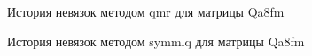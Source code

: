 \begin{figure}
    \renewcommand{\figurename}{Рисунок}
    \caption{История невязок методом qmr для матрицы Qa8fm}
    \label{fig:image}
\end{figure}

\begin{figure}
    \renewcommand{\figurename}{Рисунок}
    \caption{История невязок методом symmlq для матрицы Qa8fm}
    \label{fig:image}
\end{figure}

